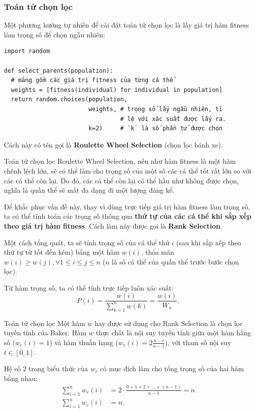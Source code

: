 \begin{frame}[fragile]
  \frametitle{Toán tử chọn lọc}

  Một phương hướng tự nhiên để cài đặt toán tử chọn lọc là lấy giá trị hàm
  fitness làm trọng số để chọn ngẫu nhiên:

  \begin{verbatim}
import random

def select_parents(population):
  # mảng gồm các giá trị fitness của từng cá thể
  weights = [fitness(individual) for individual in population]
  return random.choices(population,
                        weights, # trọng số lấy ngẫu nhiên, tỉ
                                 # lệ với xác suất được lấy ra.
                        k=2)     # `k` là số phần tử được chọn
  \end{verbatim}

  Cách này có tên gọi là \textbf{Roulette Wheel Selection} (chọn lọc bánh xe).
\end{frame}

\begin{frame}{Toán tử chọn lọc}
  Roulette Wheel Selection, nếu như hàm fitness là một hàm chênh lệch lớn, sẽ có
  thể làm cho trọng số của một số các cá thể tốt rất lớn so với các cá thể còn
  lại. Do đó, các cá thể còn lại có thể hầu như không được chọn, nghĩa là quần
  thể sẽ mất đa dạng đi một lượng đáng kể.

  Để khắc phục vấn đề này, thay vì dùng trực tiếp giá trị hàm fitness làm
  trọng số, ta có thể tính toán các trọng số thông qua \textbf{thứ tự của các cá
  thể khi sắp xếp theo giá trị hàm fitness}. Cách làm này được gọi là
  \textbf{Rank Selection}.

  Một cách tổng quát, ta sẽ tính trọng số của cá thể thứ $i$ (sau khi sắp xếp
  theo thứ tự từ tốt đến kém)
  bẳng một hàm $w(i)$, thỏa mãn $w(i) \ge w(j), \forall 1 \le i \le j \le n$ (\(
  n\) là số cá thể của quần thể trước bước chọn lọc).

  Từ hàm trọng số, ta có thể tính trực tiếp luôn xác suất:
  \[
    P(i) = \frac{w(i)}{\sum_{k = 1}^{n} w(k)} = \frac{w(i)}{W_{n}}
  .\] 
\end{frame}

\begin{frame}{Toán tử chọn lọc}
  Một hàm $w$ hay được sử dụng cho Rank Selection là chọn lọc tuyến
  tính của Baker. Hàm $w$ thực chất là nội suy tuyến tính giữa một hàm
  hằng số (\( w_{c}(i) = 1 \)) và hàm thuần hạng (\( w_{r}(i) = 2\frac{n - i}{n - 1}
  \)), với tham số nội suy \( t \in [0, 1] \).
  
  Hệ số $2$ trong biểu thức của $w_{r}$ có mục đích làm cho tổng trọng số của
  hai hàm bằng nhau:
  \begin{align*}
    \sum_{i = 1}^{n} w_{r}(i) &= 2 \cdot \frac{0 + 1 + 2 +\ldots + (n - 1)}{n
    -1} = n\\
    \sum_{i = 1}^{n} w_{c}(i) &=  n
  .\end{align*}
\end{frame}

